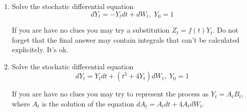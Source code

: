 \documentclass[12pt]{article}
\begin{document}
\begin{enumerate}
\item Solve the stochatic differential equation
\[
dY_t = - Y_t dt + dW_t, \; Y_0 = 1
\]

If you are have no clues you may try a substitution $Z_t = f(t) Y_t$. 
Do not forget that the final answer may contain integrals that can't be calculated explicitely. It's ok.

\item Solve the stochatic differential equation
\[
dY_t = Y_t dt + (t^3 + 4Y_t) dW_t, \; Y_0 = 1
\]

If you are have no clues you may try to represent the process as $Y_t = A_t B_t$, 
where $A_t$ is the solution of the equation $dA_t = A_t dt + 4A_t dW_t$. 


\end{enumerate}
  
\end{document}
